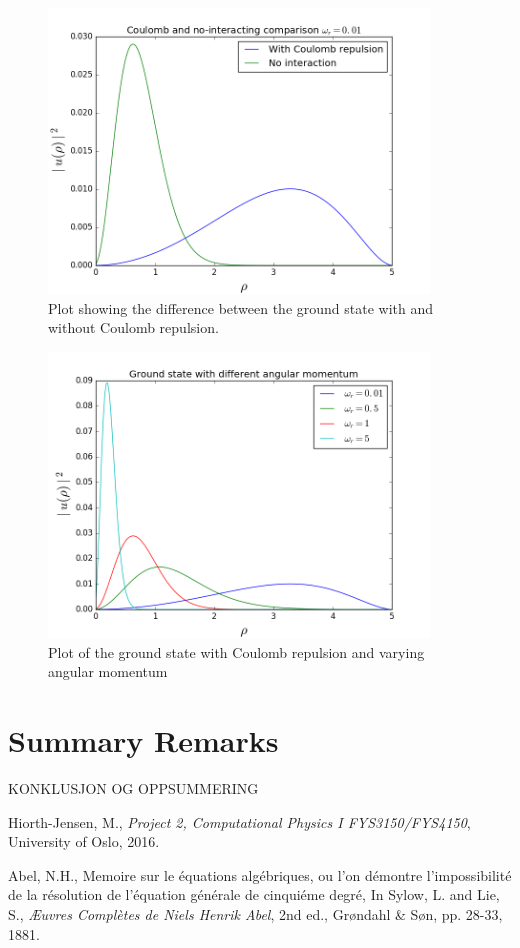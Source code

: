 \documentclass[10pt, a4paper]{amsart}
\begin{document}
\begin{figure}[ht]
	\centering
	\includegraphics[width=0.9\textwidth]{../figures/interaction.png}
	\caption{Plot showing the difference between the ground state with and without Coulomb repulsion.}
\end{figure}

\begin{figure}[ht]
	\centering
	\includegraphics[width=0.9\textwidth]{../figures/omega.png}
	\caption{Plot of the ground state with Coulomb repulsion and varying angular momentum}
\end{figure}

\section{Summary Remarks}
KONKLUSJON OG OPPSUMMERING

\begin{thebibliography}{9}

	Hiorth-Jensen, M.,
	\emph{Project 2, Computational Physics I FYS3150/FYS4150},
	University of Oslo,
	2016.
	
	Abel, N.H.,
	Memoire sur le équations algébriques, ou l'on démontre l'impossibilité de la résolution de l'équation générale de cinquiéme degré,
	In Sylow, L. and Lie, S., 
	\emph{Æuvres Complètes de Niels Henrik Abel}, 2nd ed.,
	Grøndahl \& Søn, pp. 28-33,
	1881.

\end{thebibliography}
\end{document}
